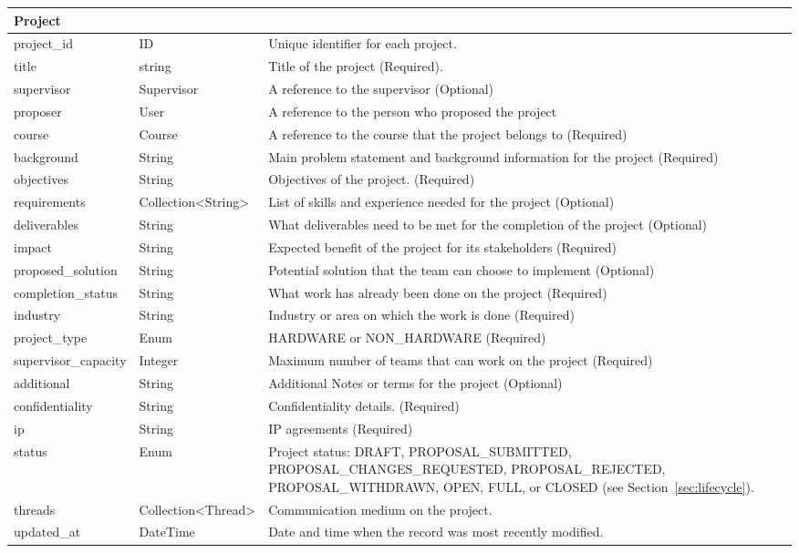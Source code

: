 \documentclass[12pt]{article}
\begin{document}
\begin{longtable}{|
      p{}|
      p{}|
      p{}|
  }
      \multicolumn{3}{|l|}{\textbf{Project}}\\ \hline
      project\_id & ID & Unique identifier for each project. \\ \hline
      title & string & Title of the project (Required). \\ \hline
      supervisor & Supervisor & A reference to the supervisor (Optional) \\ \hline
      proposer & User & A reference to the person who proposed the project \\ \hline
      course & Course & A reference to the course that the project belongs to (Required) \\ \hline
      background & String & Main problem statement and background information for the project (Required) \\ \hline
      objectives & String & Objectives of the project. (Required) \\ \hline
      requirements & Collection\textless String\textgreater & List of skills and experience needed for the project (Optional) \\ \hline
      deliverables & String & What deliverables need to be met for the completion of the project (Optional) \\ \hline
      impact & String & Expected benefit of the project for its stakeholders (Required) \\ \hline
      proposed\_solution & String & Potential solution that the team can choose to implement (Optional) \\ \hline
      completion\_status & String & What work has already been done on the project (Required) \\ \hline
      industry & String & Industry or area on which the work is done (Required) \\ \hline
      project\_type & Enum & HARDWARE or NON\_HARDWARE (Required) \\ \hline
      supervisor\_capacity & Integer & Maximum number of teams that can work on the project (Required) \\ \hline
      additional & String & Additional Notes or terms for the project (Optional) \\ \hline
      confidentiality & String & Confidentiality details. (Required) \\ \hline
      ip & String & IP agreements (Required) \\ \hline
      status & Enum & Project status: DRAFT, PROPOSAL\_SUBMITTED, PROPOSAL\_CHANGES\_REQUESTED, PROPOSAL\_REJECTED, PROPOSAL\_WITHDRAWN, OPEN, FULL, or CLOSED (see Section~\ref{sec:lifecycle}). \\ \hline
      threads & Collection\textless Thread\textgreater & Communication medium on the project. \\ \hline
      updated\_at & DateTime & Date and time when the record was most recently modified. \\ \hline


\end{longtable}
\end{document}
